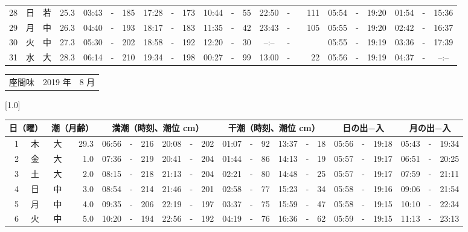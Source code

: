 \documentclass[12pt,a4j]{jsarticle}
\begin{document}
\begin{table}[htbp]
\begin{center}
{\begin{tabular}{|rc|cr|ccrccr|ccrccr|ccc|ccc|}
28 & 日 & 若 & 25.3 &  03:43 &-& 185 &  17:28 &-& 173 &  10:44 &-&  55 &  22:50 &-& 111 & 05:54 & -& 19:20 & 01:54 & -& 15:36 \\
29 & 月 & 中 & 26.3 &  04:40 &-& 193 &  18:17 &-& 183 &  11:35 &-&  42 &  23:43 &-& 105 & 05:55 & -& 19:20 & 02:42 & -& 16:37 \\
30 & 火 & 中 & 27.3 &  05:30 &-& 202 &  18:58 &-& 192 &  12:20 &-&  30 &  --:-- &-&~~~~~ & 05:55 & -& 19:19 & 03:36 & -& 17:39 \\
31 & 水 & 大 & 28.3 &  06:14 &-& 210 &  19:34 &-& 198 &  00:27 &-&  99 &  13:00 &-&  22 & 05:56 & -& 19:19 & 04:37 & -& --:-- \\
   \hline
   \end{tabular}}
   \end{center}
\end{table}
\newpage
 \begin{table}[htbp]
 \begin{center}
 \begin{tabular}{lcc}
 \LARGE{座間味}  & \large{2019 年} & \large{ 8 月} \\
 \end{tabular}
 \end{center}
 \begin{center}
    \scalebox{0.7}[1.0]{
    \begin{tabular}{|rc|cr|ccrccr|ccrccr|ccc|ccc|}
    \hline
    \multicolumn{2}{|c|}{日（曜）} & \multicolumn{2}{c|}{潮（月齢）} & \multicolumn{6}{c|}{満潮（時刻、潮位 cm）} & \multicolumn{6}{c|}{干潮（時刻、潮位 cm）} & \multicolumn{3}{c|}{日の出−入} &  \multicolumn{3}{c|}{月の出−入}\\
 \hline
 1 & 木 & 大 & 29.3 &  06:56 &-& 216 &  20:08 &-& 202 &  01:07 &-&  92 &  13:37 &-&  18 & 05:56 & -& 19:18 & 05:43 & -& 19:34 \\
 2 & 金 & 大 &  1.0 &  07:36 &-& 219 &  20:41 &-& 204 &  01:44 &-&  86 &  14:13 &-&  19 & 05:57 & -& 19:17 & 06:51 & -& 20:25 \\
 3 & 土 & 大 &  2.0 &  08:15 &-& 218 &  21:13 &-& 204 &  02:21 &-&  80 &  14:48 &-&  25 & 05:57 & -& 19:17 & 07:59 & -& 21:11 \\
 4 & 日 & 中 &  3.0 &  08:54 &-& 214 &  21:46 &-& 201 &  02:58 &-&  77 &  15:23 &-&  34 & 05:58 & -& 19:16 & 09:06 & -& 21:54 \\
 5 & 月 & 中 &  4.0 &  09:35 &-& 206 &  22:19 &-& 197 &  03:37 &-&  75 &  15:59 &-&  47 & 05:58 & -& 19:15 & 10:10 & -& 22:34 \\
 6 & 火 & 中 &  5.0 &  10:20 &-& 194 &  22:56 &-& 192 &  04:19 &-&  76 &  16:36 &-&  62 & 05:59 & -& 19:15 & 11:13 & -& 23:13 \\

\end{tabular}}
\end{center}
\end{table}
\end{document}
